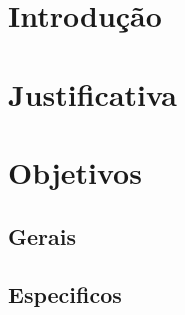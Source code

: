 \documentclass[12pt]{article}
\begin{document}
\maketitle
%

%
\section{Introdução}
  
%
\section{Justificativa}
  
%
\section{Objetivos}
  
%
\subsection{Gerais}
  
\subsection{Especificos}
  
%
\nocite{*}


%
%
\end{document}
